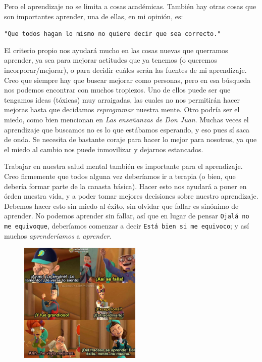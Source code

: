 \documentclass[letterpaper,11pt]{article}
\begin{document}
Pero el aprendizaje no se limita a cosas académicas. También hay otras cosas 
que son importantes aprender, una de ellas, en mi opinión, es:
\begin{center}
    \texttt{"Que todos hagan lo mismo no quiere decir que sea correcto."}
\end{center}

El criterio propio nos ayudará mucho en las cosas nuevas que querramos aprender,
ya sea para mejorar actitudes que ya tenemos (o queremos incorporar/mejorar), o 
para decidir cuáles serán las fuentes de mi aprendizaje. Creo que siempre hay 
que buscar mejorar como personas, pero en esa búsqueda nos podemos encontrar 
con muchos tropiezos. Uno de ellos puede ser que tengamos ideas (tóxicas) muy 
arraigadas, las cuales no nos permitirán hacer mejoras hasta que decidamos 
\textit{reprogramar} nuestra mente. Otro podría ser el miedo, como bien 
mencionan en \textit{Las enseñanzas de Don Juan}. Muchas veces el aprendizaje 
que buscamos no es lo que estábamos esperando, y eso pues sí saca de onda. Se 
necesita de bastante coraje para hacer lo mejor para nosotros, ya que el miedo 
al cambio nos puede inmovilizar y dejarnos estancados. 

Trabajar en nuestra salud mental también es importante para el aprendizaje. 
Creo firmemente que todos alguna vez deberíamos ir a terapia (o bien, que 
debería formar parte de la canasta básica). Hacer esto nos ayudará a poner 
en órden nuestra vida, y a poder tomar mejores decisiones sobre nuestro 
aprendizaje. Debemos hacer esto sin miedo al éxito, sin olvidar que fallar es 
sinónimo de aprender. No podemos aprender sin fallar, así que en lugar de 
pensar \texttt{Ojalá no me equivoque}, deberíamos comenzar a decir 
\texttt{Está bien si me equivoco}; y así muchos \textit{aprenderíamos} a 
\textit{aprender}.

\begin{figure}[ht]
    \centering
    \includegraphics[width=0.52\textwidth]{./imagenes/familia.jpg}
\end{figure} 
\end{document}
